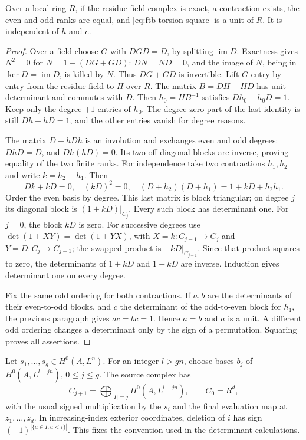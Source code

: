 \begin{srlemma}
\label{lem:ftb-squared-torsion}
Over a local ring \(R\), if the residue-field complex is exact,
a contraction exists, the even and odd ranks are equal, and
\eqref{eq:ftb-torsion-square} is a unit of \(R\).
It is independent of \(h\) and \(e\).
\end{srlemma}
\begin{proof}
Over a field choose \(G\) with \(DGD=D\), by splitting
\(\operatorname{im}D\).  Exactness gives
\(N^2=0\) for \(N=1-(DG+GD)\): \(DN=ND=0\), and the image of
\(N\), being in \(\ker D=\operatorname{im}D\), is killed by \(N\).
Thus \(DG+GD\) is invertible.
Lift \(G\) entry by entry from the residue field to \(H\) over \(R\).
The matrix \(B=DH+HD\) has unit determinant and commutes with \(D\).
Then \(h_0=HB^{-1}\) satisfies \(Dh_0+h_0D=1\).
Keep only the degree \(+1\) entries of \(h_0\).  The degree-zero
part of the last identity is still \(Dh+hD=1\), and the other
entries vanish for degree reasons.

The matrix \(D+hDh\) is an involution and exchanges even and odd
degrees: \(DhD=D\), and
\(Dh(hD)=0\).  Its two off-diagonal blocks are inverse, proving
equality of the two finite ranks.
For independence take two contractions \(h_1,h_2\) and write
\(k=h_2-h_1\).  Then
\[
 Dk+kD=0,\quad (kD)^2=0,\quad
 (D+h_2)(D+h_1)=1+kD+h_2h_1 .
\]
Order the even basis by degree.  This last matrix is block triangular;
on degree \(j\) its diagonal block is \((1+kD)|_{C_j}\).
Every such block has determinant one.  For \(j=0\), the block \(kD\)
is zero.  For successive degrees use
\(\det(1+XY)=\det(1+YX)\), with
\(X=k:C_{j-1}\to C_j\) and \(Y=D:C_j\to C_{j-1}\);
the swapped product is \(-kD|_{C_{j-1}}\).
Since that product squares to zero, the determinants of
\(1+kD\) and \(1-kD\) are inverse.  Induction gives determinant one
on every degree.

Fix the same odd ordering for both contractions.
If \(a,b\) are the determinants of their even-to-odd blocks, and
\(c\) the determinant of the odd-to-even block for \(h_1\), the
previous paragraph gives \(ac=bc=1\).  Hence \(a=b\) and \(a\)
is a unit.  A different odd ordering changes a determinant only by
the sign of a permutation.  Squaring proves all assertions.
\end{proof}

Let \(s_1,\ldots,s_g\in H^0(A,L^n)\).
For an integer \(l>gn\), choose bases \(b_j\) of
\(H^0(A,L^{l-jn})\), \(0\leq j\leq g\).
The source complex has
\[
 C_{j+1}=\bigoplus_{|I|=j}H^0(A,L^{l-jn}),
 \qquad C_0=R^d,
 \tag{K2}\label{eq:ftb-koszul-complex}
\]
with the usual signed multiplication by the \(s_i\) and the final
evaluation map at \(z_1,\ldots,z_d\).
In increasing-index exterior coordinates, deletion of \(i\) has
sign \((-1)^{|\{a\in I:a<i\}|}\).
This fixes the convention used in the determinant calculations.


